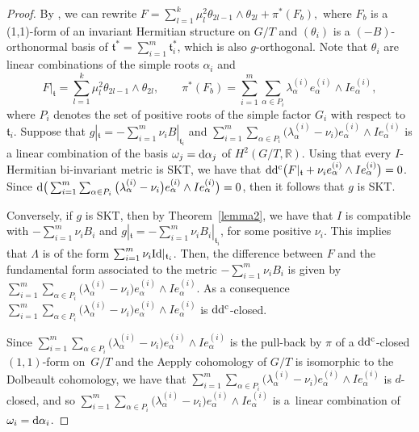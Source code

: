\documentclass[pdftex]{sigma}
\numberwithin{equation}{section}
\begin{document}
\begin{proof} By \cite{GGP}, we can rewrite $F = \sum_{l = 1}^k \mu_l^2 \theta_{2l-1}\wedge\theta_{2l} + \pi^*(F_b),$
where $F_b$ is a (1,1)-form of an invariant Hermitian structure on $G/T$ and $(\theta_i)$ is a $(-B)$-orthonormal basis of $\mathfrak t^*= \sum_{i =1}^m \mathfrak t_i^*$, which is also $g$-orthogonal. Note that $\theta_i$ are linear combinations of the simple roots $\alpha_i$ and
\[
F |_{\mathfrak t} = \sum_{l = 1}^k \mu_l^2 \theta_{2l-1}\wedge\theta_{2l}, \qquad \pi^*(F_b) = \sum_{i =1}^m \sum_{\alpha \in P_i} \lambda_{\alpha}^{(i)} e_{\alpha}^{(i)} \wedge I e_{\alpha}^{(i)},
\]
where $P_i$ denotes the set of positive roots of the simple factor $G_i$ with respect to $\mathfrak t_i$.
Suppose that $g |_{\mathfrak t} = - \sum_{i=1}^m \nu_i B|_{\mathfrak t_i}$ and $ \sum_{i =1}^m \sum_{\alpha \in P_i} \big(\lambda_{\alpha}^{(i)} - \nu_i\big) e_{\alpha}^{(i)} \wedge I e_{\alpha}^{(i)}$ is a linear combination of the basis $\omega_j = {\rm d} \alpha_j$ of $H^2(G/T, \mathbb R)$. Using that every $I$-Hermitian bi-invariant metric is SKT, we have that ${\rm d}{\rm d}^{\rm c} \big(F |_{\mathfrak t} + \nu_i e_{\alpha}^{(i)} \wedge I e_{\alpha}^{(i)}\big) =0$.
Since ${\rm d}\big(\sum_{i =1}^m \sum_{\alpha \in P_i } \big(\lambda_{\alpha}^{(i)} - \nu_i\big) e_{\alpha}^{(i)} \wedge I e_{\alpha}^{(i)}\big)=0$, then it follows that $g$ is SKT.

Conversely, if $g$ is SKT, then by Theorem~\ref{lemma2}, we have that $I$ is compatible with $- \sum_{i =1}^m \nu_i B_i$ and $g |_{\mathfrak t} = - \sum_{i =1}^m \nu_i B_i |_{\mathfrak t_i}$, for some positive $\nu_i$. This implies that $\Lambda$ is of the form $ \sum_{i=1}^m \nu_i {\rm Id}|_{\mathfrak t_i}$. Then, the difference between $F$ and the fundamental form associated to the metric $- \sum_{i =1}^m \nu_i B_i$ is given by $ \sum_{i =1}^m \sum_{\alpha \in P_i } \big(\lambda_{\alpha}^{(i)} - \nu_i\big) e_{\alpha}^{(i)} \wedge I e_{\alpha}^{(i)}$.
As a consequence $ \sum_{i =1}^m \sum_{\alpha \in P_i} \big(\lambda_{\alpha}^{(i)} - \nu_i\big) e_{\alpha}^{(i)} \wedge I e_{\alpha}^{(i)}$ is ${\rm d} {\rm d}^{\rm c}$-closed.

Since $ \sum_{i =1}^m \sum_{\alpha \in P_i} \big(\lambda_{\alpha}^{(i)} - \nu_i\big) e_{\alpha}^{(i)} \wedge I e_{\alpha}^{(i)}$ is the pull-back by $\pi$ of a ${\rm d} {\rm d}^{\rm c}$-closed $(1,1)$-form on~$G/T$ and the Aepply cohomology of $G/T$ is isomorphic to the Dolbeault cohomology, we have that $ \sum_{i =1}^m \sum_{\alpha \in P_i} \big(\lambda_{\alpha}^{(i)} - \nu_i\big) e_{\alpha}^{(i)} \wedge I e_{\alpha}^{(i)}$ is $d$-closed, and so $ \sum_{i =1}^m \sum_{\alpha \in P_i} \big(\lambda_{\alpha}^{(i)} - \nu_i\big) e_{\alpha}^{(i)} \wedge I e_{\alpha}^{(i)}$ is a~linear combination of $ \omega_i = {\rm d} \alpha_i$.
\end{proof}
\end{document}
